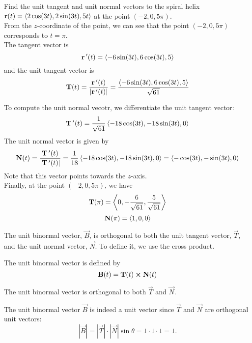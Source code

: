 \documentclass[handout]{ximera}
\begin{document}
\begin{example}[example 1]
Find the unit tangent and unit normal vectors to the spiral helix $\mathbf r(t) =  \left\langle 2\cos(3t), 2\sin(3t), 5t\right\rangle$ at the point $(-2, 0, 5\pi)$.\\
From the $z$-coordinate of the point, we can see that the point $(-2, 0, 5\pi)$ corresponds to $t = \pi$.\\
The tangent vector is
\[
\mathbf r \,'(t) = \left\langle -6 \sin(3t), 6\cos(3t), 5\right\rangle
\]
and the unit tangent vector is
\[
\mathbf T(t) = \frac{\mathbf r\,'(t)}{|\mathbf r\,'(t)|} = \frac{\left\langle -6 \sin(3t), 6\cos(3t), 5\right\rangle}{\sqrt{61}}
\]

To compute the unit normal vecotr, we differentiate the unit tangent vector:
\[
\mathbf T\,'(t) = \frac{1}{\sqrt{61}} \left\langle -18 \cos(3t), -18 \sin(3t), 0\right\rangle
\]
The unit normal vector is given by
\[
\mathbf N(t) = \frac{\mathbf T\,'(t)}{|\mathbf T\,'(t)|} = \frac{1}{18} \left\langle -18 \cos(3t), -18 \sin(3t), 0\right\rangle = \left\langle -\cos(3t), -\sin(3t), 0\right\rangle
\]
Note that this vector points towards the $z$-axis.\\
Finally, at the point $(-2, 0, 5\pi)$, we have
\[
\mathbf T(\pi) = \left\langle 0, -\frac{6}{\sqrt{61}}, \frac{5}{\sqrt{61}}\right\rangle
\]
\[
\mathbf N(\pi) = \left\langle 1, 0, 0\right\rangle
\]
\end{example}

The unit binormal vector, $\vec B$, is orthogonal to both the unit tangent vector, $\vec T$, and the unit normal vector, $\vec N$. To define it, we use the cross product.

\begin{definition}
The unit binormal vector is defined by
\[
\mathbf B(t) = \mathbf T(t) \boldsymbol\times \mathbf N(t)
\]
\end{definition}

\begin{remark}
The unit binormal vector is orthogonal to both $\vec T$ and $\vec N$. 
\end{remark}

\begin{remark}
The unit binormal vector $\vec B$ is indeed a unit vector since $\vec T$ and $\vec N$ are orthogonal unit vectors:
\[
|\vec B| = |\vec T| \cdot |\vec N| \sin \theta = 1 \cdot 1 \cdot 1 = 1.
\]
\end{remark}
\end{document}
